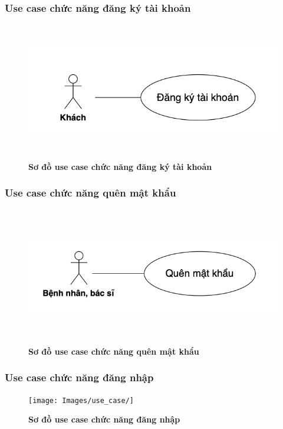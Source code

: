 \documentclass{article}%
\begin{document}
\subsubsection{Use case chức năng đăng ký tài khoản}
  \begin{figure}[H]
    \centering
    \includegraphics[width=15cm,height=6cm]{Images/use_case/use_case_register.png}
    \caption[Sơ đồ use case chức năng đăng ký tài khoản]{\bfseries \fontsize{12pt}{0pt}
    \selectfont Sơ đồ use case chức năng đăng ký tài khoản}
    \label{hinh21} %
  \end{figure}

\subsubsection{Use case chức năng quên mật khẩu}
  \begin{figure}[H]
    \centering
    \includegraphics[width=15cm,height=6cm]{Images/use_case/use_case_forgot_password.png}
    \caption[Sơ đồ use case chức năng quên mật khẩu]{\bfseries \fontsize{12pt}{0pt}
    \selectfont Sơ đồ use case chức năng quên mật khẩu}
    \label{hinh21} %
  \end{figure}

\subsubsection{Use case chức năng đăng nhập}
  \begin{figure}[H]
    \centering
    \texttt{[image: Images/use\_case/]}
    \caption[Sơ đồ use case chức năng đăng nhập]{\bfseries \fontsize{12pt}{0pt}
    \selectfont Sơ đồ use case chức năng đăng nhập}
    \label{hinh21} %
  \end{figure}
\end{document}
